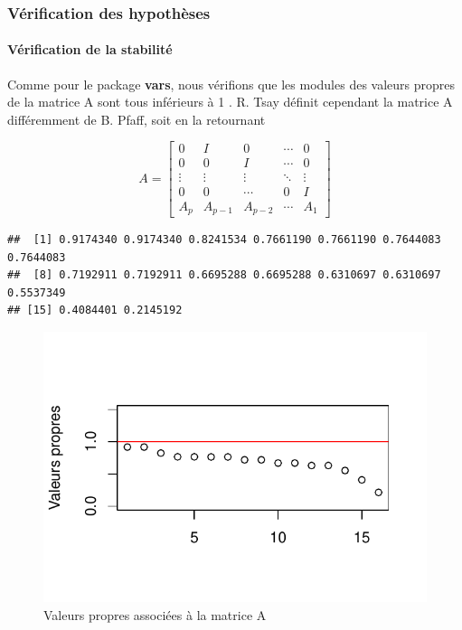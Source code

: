 \documentclass[11pt,]{article}
\let\oldparagraph\paragraph
\renewcommand{\paragraph}[1]{\oldparagraph{#1}\mbox{}}
\begin{document}
\subsubsection{Vérification des
hypothèses}\label{verification-des-hypotheses}

\paragraph{Vérification de la
stabilité}\label{verification-de-la-stabilite}

Comme pour le package \textbf{vars}, nous vérifions que les modules des
valeurs propres de la matrice A sont tous inférieurs à 1 . R. Tsay
définit cependant la matrice A différemment de B. Pfaff, soit en la
retournant

\[A = \begin{bmatrix}
0 & I & 0 & \cdots & 0 \\
0 & 0 & I & \cdots & 0 \\
\vdots & \vdots & \vdots & \ddots & \vdots \\
0 & 0 & \cdots & 0 & I \\
A_p & A_{p-1} & A_{p-2} & \cdots  & A_1 
\end{bmatrix}\]

\begin{verbatim}
##  [1] 0.9174340 0.9174340 0.8241534 0.7661190 0.7661190 0.7644083 0.7644083
##  [8] 0.7192911 0.7192911 0.6695288 0.6695288 0.6310697 0.6310697 0.5537349
## [15] 0.4084401 0.2145192
\end{verbatim}

\begin{figure}[htbp]
\centering
\includegraphics{doc_files/figure-latex/unnamed-chunk-46-1.pdf}
\caption{\label{fig27} Valeurs propres associées à la matrice A}
\end{figure}
\end{document}
